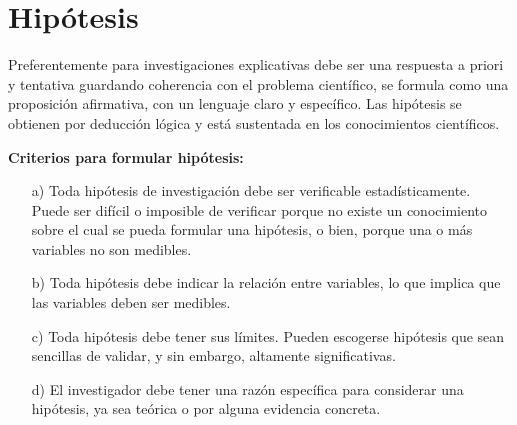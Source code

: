 \section{Hipótesis}
Preferentemente para investigaciones explicativas debe ser una respuesta a priori y tentativa guardando coherencia con el problema científico, se formula como una proposición afirmativa, con un lenguaje claro y específico.  Las hipótesis se obtienen por deducción lógica y está sustentada en los conocimientos científicos. \par  
\vskip 0.3cm
{\bf Criterios para formular hipótesis:}
\begin{enumerate}
\item[a)] Toda hipótesis de investigación debe ser verificable estadísticamente.  Puede ser difícil o imposible de verificar porque no existe un conocimiento sobre el cual se pueda formular una hipótesis, o bien, porque una o más variables no son medibles.
\vskip 0.2cm
\item[b)] Toda hipótesis debe indicar la relación entre variables, lo que implica que las variables deben ser medibles.
\vskip 0.2cm
\item[c)] Toda hipótesis debe tener sus límites. Pueden escogerse hipótesis que sean sencillas de validar, y sin embargo, altamente significativas.
\vskip 0.2cm
\item[d)] El investigador debe tener una razón específica para considerar una hipótesis, ya sea teórica o por alguna evidencia concreta.    
\end{enumerate}
